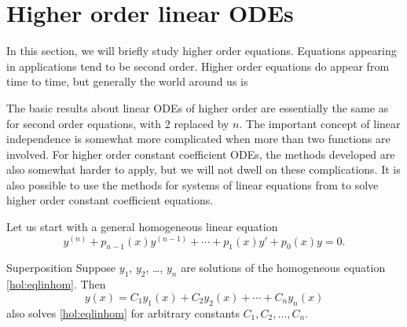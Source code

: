 \section{Higher order linear ODEs} \label{sec:hol}




%

In this section, we will briefly study higher order equations.
Equations appearing in applications tend to be second
order.  Higher order equations do appear from time to time, but
generally the world around us is   

The basic results about linear ODEs of higher order are essentially 
the same as for second order equations, with 2 replaced by $n$.
The important concept
of linear independence is somewhat more complicated when more than two
functions are involved.
For higher order constant coefficient ODEs, the methods developed are also
somewhat harder to apply,
but we will not dwell on these complications.
It is also possible to use the methods for systems
of linear equations from  to solve higher order
constant coefficient equations.

Let us start with a general homogeneous linear equation
\begin{equation} \label{hol:eqlinhom}
y^{(n)} + p_{n-1}(x)y^{(n-1)} + \cdots + p_1(x) y' + p_0(x) y = 0 .
\end{equation}

\begin{theorem1}{Superposition}
Suppose $y_1$, $y_2$, \ldots, $y_n$ are solutions of the
homogeneous equation \eqref{hol:eqlinhom}.  Then 
\begin{equation*}
y(x) = C_1 y_1(x) + C_2 y_2(x) + \cdots + C_n y_n(x) 
\end{equation*}
also solves \eqref{hol:eqlinhom}
for arbitrary constants $C_1, C_2, \ldots, C_n$.
\end{theorem1}

